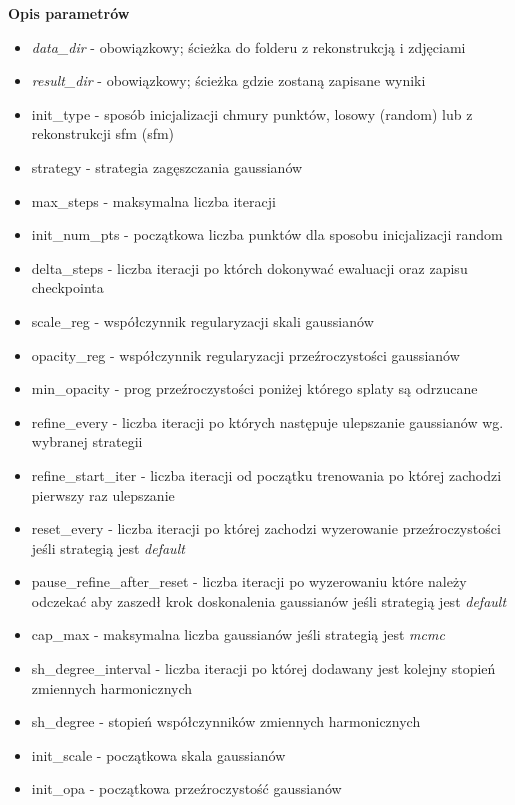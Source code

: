 \textbf{Opis parametrów}
\begin{itemize}
  \item \textit{data\_dir} - obowiązkowy; ścieżka do folderu z rekonstrukcją i zdjęciami
  \item \textit{result\_dir} - obowiązkowy; ścieżka gdzie zostaną zapisane wyniki
  \item init\_type - sposób inicjalizacji chmury punktów, losowy (random) lub z rekonstrukcji sfm (sfm)
  \item strategy - strategia zagęszczania gaussianów
  \item max\_steps - maksymalna liczba iteracji
  \item init\_num\_pts - początkowa liczba punktów dla sposobu inicjalizacji random
  \item delta\_steps - liczba iteracji po którch dokonywać ewaluacji oraz zapisu checkpointa
  \item scale\_reg - współczynnik regularyzacji skali gaussianów
  \item opacity\_reg - współczynnik regularyzacji przeźroczystości gaussianów
  \item min\_opacity - prog przeźroczystości poniżej którego splaty są odrzucane
  \item refine\_every - liczba iteracji po których następuje ulepszanie gaussianów wg. wybranej strategii 
  \item refine\_start\_iter - liczba iteracji od początku trenowania po której zachodzi pierwszy raz ulepszanie
  \item reset\_every - liczba iteracji po której zachodzi wyzerowanie przeźroczystości jeśli strategią jest \textit{default}
  \item pause\_refine\_after\_reset - liczba iteracji po wyzerowaniu które należy odczekać aby zaszedł krok doskonalenia gaussianów jeśli strategią jest \textit{default}
  \item cap\_max - maksymalna liczba gaussianów jeśli strategią jest \textit{mcmc}
  \item sh\_degree\_interval - liczba iteracji po której dodawany jest kolejny stopień zmiennych harmonicznych
  \item sh\_degree - stopień współczynników zmiennych harmonicznych 
  \item init\_scale - początkowa skala gaussianów 
  \item init\_opa - początkowa przeźroczystość gaussianów
\end{itemize}